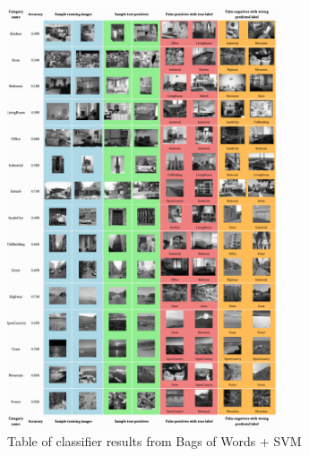 \begin{figure}[h!]
    \centering
    \captionsetup{justification=centering}
    \includegraphics[width=8cm]{table.png}
    \caption{Table of classifier results from Bags of Words + SVM}
\end{figure}

